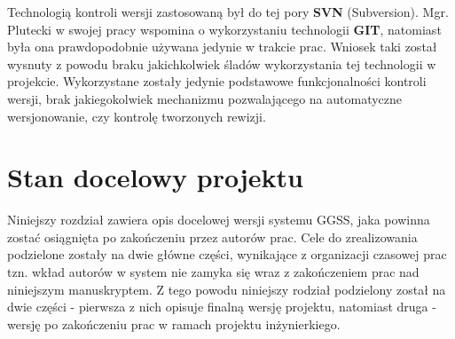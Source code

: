 Technologią kontroli wersji zastosowaną był do tej pory \textbf{SVN} (Subversion). Mgr. Plutecki w swojej pracy wspomina o wykorzystaniu technologii \textbf{GIT}, natomiast była ona prawdopodobnie używana jedynie w trakcie prac. Wniosek taki został wysnuty z powodu braku jakichkolwiek śladów wykorzystania tej technologii w projekcie. Wykorzystane zostały jedynie podstawowe funkcjonalności kontroli wersji, brak jakiegokolwiek mechanizmu pozwalającego na automatyczne wersjonowanie, czy kontrolę tworzonych rewizji.



\chapter{Stan docelowy projektu}
\label{cha:docel}
Niniejszy rozdział zawiera opis docelowej wersji systemu GGSS, jaka powinna zostać osiągnięta po zakończeniu przez autorów prac. Cele do zrealizowania podzielone zostały na dwie główne części, wynikające z organizacji czasowej prac tzn. wkład autorów w system nie zamyka się wraz z zakończeniem prac nad niniejszym manuskryptem. Z tego powodu niniejszy rodział podzielony został na dwie części - pierwsza z nich opisuje finalną wersję projektu, natomiast druga - wersję po zakończeniu prac w ramach projektu inżynierkiego.

